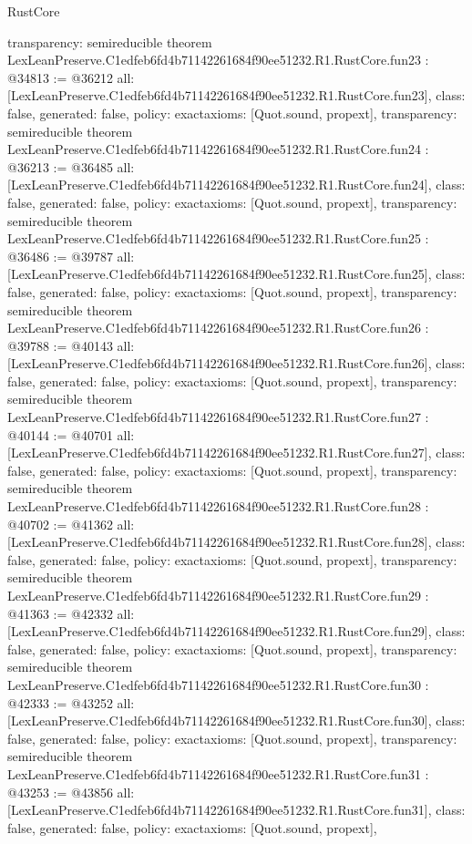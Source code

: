 \begin{lexlean}{RustCore}
\begin{coremodule}
{  transparency: semireducible
}
theorem LexLeanPreserve.C1edfeb6fd4b71142261684f90ee51232.R1.RustCore.fun23 : @34813 := @36212 {
  all: [LexLeanPreserve.C1edfeb6fd4b71142261684f90ee51232.R1.RustCore.fun23],
  class: false,
  generated: false,
  policy: exact{axioms: [Quot.sound, propext]},
  transparency: semireducible
}
theorem LexLeanPreserve.C1edfeb6fd4b71142261684f90ee51232.R1.RustCore.fun24 : @36213 := @36485 {
  all: [LexLeanPreserve.C1edfeb6fd4b71142261684f90ee51232.R1.RustCore.fun24],
  class: false,
  generated: false,
  policy: exact{axioms: [Quot.sound, propext]},
  transparency: semireducible
}
theorem LexLeanPreserve.C1edfeb6fd4b71142261684f90ee51232.R1.RustCore.fun25 : @36486 := @39787 {
  all: [LexLeanPreserve.C1edfeb6fd4b71142261684f90ee51232.R1.RustCore.fun25],
  class: false,
  generated: false,
  policy: exact{axioms: [Quot.sound, propext]},
  transparency: semireducible
}
theorem LexLeanPreserve.C1edfeb6fd4b71142261684f90ee51232.R1.RustCore.fun26 : @39788 := @40143 {
  all: [LexLeanPreserve.C1edfeb6fd4b71142261684f90ee51232.R1.RustCore.fun26],
  class: false,
  generated: false,
  policy: exact{axioms: [Quot.sound, propext]},
  transparency: semireducible
}
theorem LexLeanPreserve.C1edfeb6fd4b71142261684f90ee51232.R1.RustCore.fun27 : @40144 := @40701 {
  all: [LexLeanPreserve.C1edfeb6fd4b71142261684f90ee51232.R1.RustCore.fun27],
  class: false,
  generated: false,
  policy: exact{axioms: [Quot.sound, propext]},
  transparency: semireducible
}
theorem LexLeanPreserve.C1edfeb6fd4b71142261684f90ee51232.R1.RustCore.fun28 : @40702 := @41362 {
  all: [LexLeanPreserve.C1edfeb6fd4b71142261684f90ee51232.R1.RustCore.fun28],
  class: false,
  generated: false,
  policy: exact{axioms: [Quot.sound, propext]},
  transparency: semireducible
}
theorem LexLeanPreserve.C1edfeb6fd4b71142261684f90ee51232.R1.RustCore.fun29 : @41363 := @42332 {
  all: [LexLeanPreserve.C1edfeb6fd4b71142261684f90ee51232.R1.RustCore.fun29],
  class: false,
  generated: false,
  policy: exact{axioms: [Quot.sound, propext]},
  transparency: semireducible
}
theorem LexLeanPreserve.C1edfeb6fd4b71142261684f90ee51232.R1.RustCore.fun30 : @42333 := @43252 {
  all: [LexLeanPreserve.C1edfeb6fd4b71142261684f90ee51232.R1.RustCore.fun30],
  class: false,
  generated: false,
  policy: exact{axioms: [Quot.sound, propext]},
  transparency: semireducible
}
theorem LexLeanPreserve.C1edfeb6fd4b71142261684f90ee51232.R1.RustCore.fun31 : @43253 := @43856 {
  all: [LexLeanPreserve.C1edfeb6fd4b71142261684f90ee51232.R1.RustCore.fun31],
  class: false,
  generated: false,
  policy: exact{axioms: [Quot.sound, propext]},
}
\end{coremodule}
\end{lexlean}
